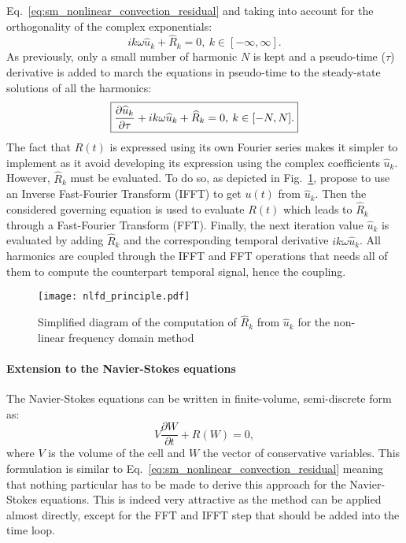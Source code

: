 Eq.~\ref{eq:sm_nonlinear_convection_residual} and taking into account
for the orthogonality of the complex exponentials:
\begin{equation}
	i k \omega \widehat{u}_k + \widehat{R}_k = 0, \: k \in [-\infty, \infty].
\end{equation}
As previously, only a small number of harmonic $N$ is kept and 
a pseudo-time ($\tau$) derivative is added to march the equations
in pseudo-time to the steady-state solutions of all the harmonics:
\begin{equation}
	\fbox{$
	\displaystyle \frac{\partial \widehat{u}_k}{\partial \tau} + 
	i k \omega \widehat{u}_k + \widehat{R}_k = 0, \: k \in [-N, N].
	$}
	\label{eq:sm_nlfd_subset_eq}
\end{equation}
The fact that $R(t)$ is expressed using its own Fourier series 
makes it simpler to implement 
as it avoid developing its expression using 
the complex coefficients $\widehat{u}_k$.
However, $\widehat{R}_k$ must be evaluated. To do so, as depicted
in Fig.~\ref{fig:nlfd_principle}, \citet{McMullen2001}
propose to use an Inverse Fast-Fourier Transform (IFFT) to get
$u(t)$ from $\widehat{u}_k$. Then the considered governing equation
is used to evaluate $R(t)$ which leads to $\widehat{R}_k$
through a Fast-Fourier Transform (FFT). Finally, the next iteration value 
$\widehat{u}_k$
is evaluated by adding $\widehat{R}_k$ and 
the corresponding temporal derivative $i k \omega \widehat{u}_k$. All
harmonics are coupled through the IFFT and FFT operations
that needs all of them to compute the counterpart temporal signal,
hence the coupling.
\begin{figure}[htbp]
  \centering
  \texttt{[image: nlfd\_principle.pdf]}
  \caption{Simplified diagram of the computation of $\widehat{R}_k$ from $\widehat{u}_k$
  for the non-linear frequency domain method}
  \label{fig:nlfd_principle}
\end{figure}

\paragraph{Extension to the Navier-Stokes equations}
The Navier-Stokes equations can be written in finite-volume,
semi-discrete form as:
\begin{equation}
	V \frac{\partial W}{\partial t} + R(W) = 0,
	\label{eq:navier_stokes_fv_sd}
\end{equation}
where $V$ is the volume of the cell and $W$
the vector of conservative variables.
This formulation is similar to
Eq.~\ref{eq:sm_nonlinear_convection_residual} meaning that
nothing particular has to be made to derive this approach for
the Navier-Stokes equations. This is indeed very attractive as the
method can be applied almost directly, except for the FFT and IFFT
step that should be added into the time loop.

